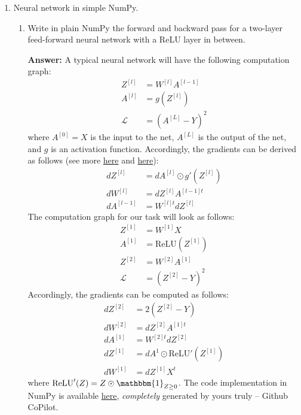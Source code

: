 \documentclass{article}
\newenvironment{QandA}{\begin{enumerate}[label=\arabic*.]}{\end{enumerate}}
\newenvironment{InnerQandA}{\begin{enumerate}[label=\roman*.]}{\end{enumerate}}
\newenvironment{answer}{\par\normalfont \textbf{Answer:}}{}
\begin{document}
\begin{QandA}
    \item Neural network in simple NumPy.
    \begin{InnerQandA}
        \item Write in plain NumPy the forward and backward pass for a two-layer feed-forward neural network with a ReLU layer in between.
        \begin{answer}
            A typical neural network will have the following computation graph:
            \begin{align*}
                Z^{[l]} &= W^{[l]} A^{[l-1]} \\
                A^{[l]} &= g(Z^{[l]}) \\
                \mathcal{L} &= \left( A^{[L]} - Y \right)^2
            \end{align*}
            where $A^{[0]} = X$ is the input to the net, $A^{[L]}$ is the output of the net, and $g$ is an activation function. Accordingly, the gradients can be derived as follows (see more \href{https://edwardshu.com/posts/matrix-matrix-gradient}{here} and \href{https://towardsdatascience.com/lets-code-a-neural-network-in-plain-numpy-ae7e74410795}{here}):
            \begin{align*}
                dZ^{[l]} &= dA^{[l]} \odot g'(Z^{[l]}) \\
                dW^{[l]} &= dZ^{[l]} A^{[l-1]t} \\
                dA^{[l-1]} &= W^{[l]t} dZ^{[l]}
            \end{align*}
            The computation graph for our task will look as follows:
            \begin{align*}
                Z^{[1]} &= W^{[1]}X \\
                A^{[1]} &= \text{ReLU}(Z^{[1]}) \\
                Z^{[2]} &= W^{[2]} A^{[1]} \\
                \mathcal{L} &= \left( Z^{[2]} - Y \right)^2
            \end{align*}
            Accordingly, the gradients can be computed as follows:
            \begin{align*}
                dZ^{[2]} &= 2(Z^{[2]} - Y)\\
                dW^{[2]} &= dZ^{[2]} A^{[1]t} \\
                dA^{[1]} &= W^{[2]t} dZ^{[2]} \\ 
                dZ^{[1]} &= dA^{1} \odot \text{ReLU}' (Z^{[1]}) \\
                dW^{[1]} &= dZ^{[1]} X^t
            \end{align*}
            where $\text{ReLU}'(Z) = Z \odot \mathbbm{1}_{Z \ge 0}$. The code implementation in NumPy is available \href{https://gist.github.com/zaf-stojano/136b6cc1675bb0e14972d937c390b7a6}{here}, \textit{completely} generated by yours truly -- Github CoPilot.
        \end{answer}


\end{InnerQandA}
\end{QandA}
\end{document}
